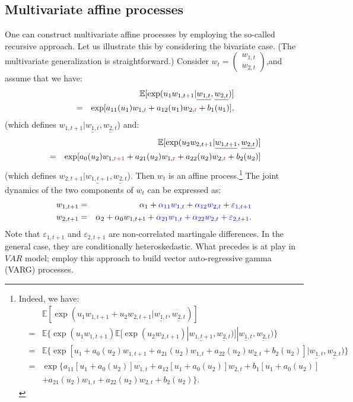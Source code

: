 \documentclass[
  12pt,
]{book}
\theoremstyle{definition}
\theoremstyle{definition}
\theoremstyle{definition}
\theoremstyle{definition}
\theoremstyle{remark}
\begin{document}
\hypertarget{buildingmulti}{%
\subsection{Multivariate affine processes}\label{buildingmulti}}

One can construct multivariate affine processes by employing the so-called recursive approach. Let us illustrate this by considering the bivariate case. (The multivariate generalization is straightforward.) Consider \(w_t = \left(\begin{array}{c} w_{1,t}\\ w_{2,t} \end{array} \right)\),and assume that we have:
\begin{eqnarray*}
&&\mathbb{E}[\exp(u_1 w_{1,t+1}|\underline{w_{1,t}}, \underline{w_{2,t}})]\\
&=& \exp[a_{11}(u_1)w_{1,{\color{red}{t}}}+a_{12}(u_1)w_{2,{\color{red}{t}}}+b_{1}(u_1)],
\end{eqnarray*}
(which defines \(w_{1,t+1}|\underline{w_{1,t}}, \underline{w_{2,t}}\)) and:
\begin{eqnarray*}
&& \mathbb{E}[\exp(u_2 w_{2,t+1}|\underline{w_{1,t+1}}, \underline{w_{2,t}})]\\
&= & \exp[a_0(u_2)w_{1,{\color{red}{t+1}}}+a_{21}(u_2)w_{1,{\color{red}{t}}}+a_{22}(u_2)w_{2,{\color{red}{t}}}+b_2(u_2)]
\end{eqnarray*}
(which defines \(w_{2,t+1}|\underline{w_{1,t+1}}, \underline{w_{2,t}}\)). Then \(w_t\) is an affine process.\footnote{Indeed, we have:
  \begin{eqnarray*}
  && \mathbb{E}[\exp(u_1 w_{1,t+1}+u_2 w_{2,t+1}|\underline{w_{1,t}}, \underline{w_{2,t}})]\\
  &= & \mathbb{E}\{\exp(u_1 w_{1,t+1}) \mathbb{E}[\exp(u_{2}w_{2,t+1})|\underline{w_{1,t+1}}, \underline{w_{2,t}})]|\underline{w_{1,t}}, \underline{w_{2,t}})\} \\
  &= & \mathbb{E}\{\exp[u_1+a_0(u_2)w_{1,t+1}+a_{21}(u_2)w_{1,t} + a_{22}(u_2)w_{2,t}+b_2(u_2)]|\underline{w_{1,t}}, \underline{w_{2,t}})\} \\
  &= & \exp\{a_{11}[u_1+a_0(u_2)]w_{1,t}+a_{12}[u_1+a_0(u_2)]w_{2,t}+b_1[u_1+a_0(u_2)] \\
  &&+  a_{21}(u_2)w_{1,t}+a_{22}(u_2)w_{2,t}+b_2(u_2)\}.
  \end{eqnarray*}}
The joint dynamics of the two components of \(w_t\) can be expressed as:
\begin{eqnarray*}
w_{1,t+1} &=& \alpha_1 + \color{blue}{\alpha_{11}w_{1,t} + \alpha_{12}w_{2,t}} + \varepsilon_{1,t+1} \\
w_{2,t+1} &=& \alpha_2 + \alpha_{0}w_{1,t+1} + \color{blue}{\alpha_{21}w_{1,t} + \alpha _{22} w_{2,t}} + \varepsilon_{2,t+1}.
\end{eqnarray*}
Note that \(\varepsilon_{1,t+1}\) and \(\varepsilon_{2,t+1}\) are non-correlated martingale differences. In the general case, they are conditionally heteroskedastic. What precedes is at play in \(VAR\) model; \citet{zarg_2017} employ this approach to build vector auto-regressive gamma (VARG) processes.
\end{document}
